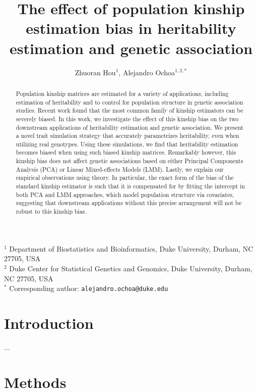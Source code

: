 \documentclass[11pt]{article}
\title{\Large \textbf{The effect of population kinship estimation bias in heritability estimation and genetic association}}
\author{Zhuoran Hou$^1$, Alejandro Ochoa$^{1,2,*}$}
\date{}
\begin{document}
\maketitle

\noindent
$^1$ Department of Biostatistics and Bioinformatics, Duke University, Durham, NC 27705, USA \\
$^2$ Duke Center for Statistical Genetics and Genomics, Duke University, Durham, NC 27705, USA \\
$^*$ Corresponding author: \texttt{alejandro.ochoa@duke.edu}


\begin{abstract}
  Population kinship matrices are estimated for a variety of applications, including estimation of heritability and to control for population structure in genetic association studies.
  Recent work found that the most common family of kinship estimators can be severely biased.
  In this work, we investigate the effect of this kinship bias on the two downstream applications of heritability estimation and genetic association.
  We present a novel trait simulation strategy that accurately parametrizes heritability, even when utilizing real genotypes.
  Using these simulations, we find that heritability estimation becomes biased when using such biased kinship matrices.
  Remarkably however, this kinship bias does not affect genetic associations based on either Principal Components Analysis (PCA) or Linear Mixed-effects Models (LMM).
  Lastly, we explain our empirical observations using theory.
  In particular, the exact form of the bias of the standard kinship estimator is such that it is compensated for by fitting the intercept in both PCA and LMM approaches, which model population structure via covariates, suggesting that downstream applications without this precise arrangement will not be robust to this kinship bias.
\end{abstract}



\clearpage
	
\section{Introduction} 

...

\section{Methods}
\end{document}
